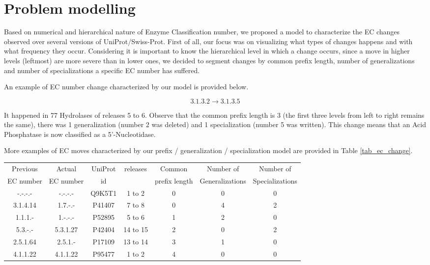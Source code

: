 \section{Problem modelling}

Based on numerical and hierarchical nature of Enzyme Classification number, we  proposed a model to characterize the EC changes observed over several versions of UniProt/Swiss-Prot. First of all, our focus was on visualizing what types of changes happens and with what frequency they occur. Considering it is important to know the hierarchical level in which a change occurs, since a move in higher levels (leftmost) are more severe than in lower ones, we decided to segment changes by common prefix length, number of generalizations and number of specializations a specific EC number has suffered.

An example of EC number change characterized by our model is provided below.

$$3.1.3.2 \rightarrow 3.1.3.5$$

It happened in 77 Hydrolases of releases 5 to 6. Observe that the common prefix length is 3 (the first three levels from left to right remains the same), there was 1 generalization (number 2 was deleted) and 1 specialization (number 5 was written). This change means that an Acid Phosphatase is now classified as a 5'-Nucleotidase.

More examples of EC moves characterized by our prefix / generalization / specialization model are provided in Table \ref{tab_ec_change}.

\begin{table*}[h]
  \caption{Example of EC numbers across consecutive database releases and our prefix / generalization / specialization model}
  \label{tab_ec_change}
  \scriptsize
  \begin{center}
    \begin{tabular}{ccccccc}
Previous & Actual & UniProt & releases & Common & Number of  & Number of \\
EC number & EC number & id & & prefix length  &  Generalizations & Specializations \\

    \hline
      -.-.-.- & -.-.-.- & Q9K5T1 & 1 to 2 & 0 & 0 & 0\\
      3.1.4.14 & 1.7.-.- & P41407 & 7 to 8 & 0 & 4 & 2 \\
      1.1.1.- & 1.-.-.- & P52895 & 5 to 6 & 1 & 2 & 0 \\
      5.3.-.- & 5.3.1.27 & P42404 & 14 to 15 & 2 & 0 & 2 \\
      2.5.1.64 & 2.5.1.- & P17109 & 13 to 14 & 3 & 1 & 0 \\
      4.1.1.22 & 4.1.1.22 & P95477 & 1 to 2 & 4 & 0 & 0 \\
    \end{tabular}
  \end{center}
\end{table*}

